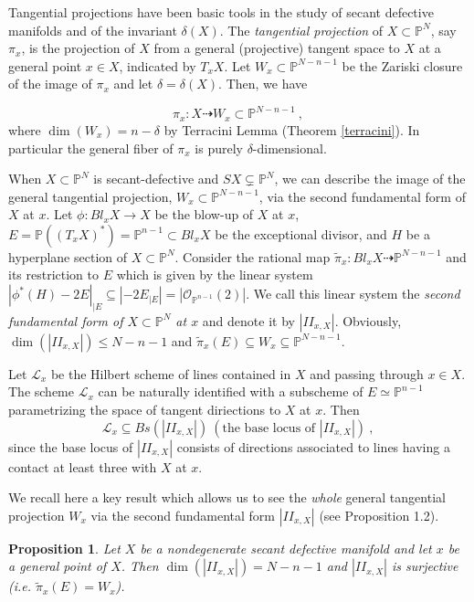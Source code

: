 \documentclass[11pt]{amsart}
\def\P{{\mathbb P}}
\theoremstyle{theorem} %
\newtheorem{Prop}[Thm]{Proposition}
\theoremstyle{definition}
\numberwithin{equation}{section}
\begin{document}
Tangential projections have been basic tools in the study of secant defective manifolds and of the invariant $\delta(X)$. The \textit{tangential projection} of $X\subset\P^N$, say $\pi_x$, is the projection of $X$ from a general (projective) tangent space to $X$ at a general point $x\in X$, indicated by $T_xX$. Let $W_x\subset\P^{N-n-1}$ be the Zariski closure of the image of $\pi_x$ and let $\delta=\delta(X)$. Then, we have

\begin{equation}\label{tg_pr}
  \pi_x : X\dashrightarrow W_x \subset \P^{N-n-1}~,
\end{equation}
where $\dim(W_x)=n-\delta$ by Terracini Lemma (Theorem \ref{terracini}). In particular the general fiber of $\pi_x$ is  purely $\delta$-dimensional. 

When $X\subset\P^N$ is secant-defective and $SX\subsetneq\P^N$, we can describe the image of the general tangential projection, $W_x\subset \P^{N-n-1}$, via the second fundamental form of $X$ at $x$. Let $\phi: Bl_xX\to X$ be the blow-up of $X$ at $x$, $E=\P((T_xX)^{\ast})=\P^{n-1}\subset Bl_xX$ be the exceptional divisor, and $H$ be a hyperplane section of $X\subset\P^N$. Consider the rational map $\tilde{\pi}_x : Bl_xX\dashrightarrow \P^{N-n-1}$ and its restriction to $E$ which is given by the linear system $|\phi^{\ast}(H)-2E|_{|E}\subseteq |-2E_{|E}|=|\mathcal O_{\P^{n-1}}(2)|$. We call this linear system the \textit{second fundamental form of $X\subset\P^N$ at $x$} and denote it by $|II_{x,X}|$. Obviously, $\dim(|II_{x,X}|)\le N-n-1$ and $\tilde{\pi}_x(E)\subseteq W_x\subseteq \P^{N-n-1}$. 

Let $\mathcal{L}_x$ be the Hilbert scheme of lines contained in $X$ and passing through $x\in X$. The scheme $\mathcal L_x$ can be naturally identified with a subscheme of $E\simeq\P^{n-1}$ parametrizing the space of tangent diriections to $X$ at $x$. Then
\begin{equation}\label{tg_pr}
  \mathcal{L}_x \subseteq Bs(|II_{x,X}|)~(\textrm{the base locus of $|II_{x,X}|$})~,
\end{equation}
since the base locus of $|II_{x,X}|$ consists of directions associated to lines having a contact at least three with $X$ at $x$. 

We recall here a key result which allows us to see the \textit{whole} general tangential projection $W_x$ via the second fundamental form $|II_{x,X}|$ (see \cite{IR2} Proposition 1.2).

\begin{Prop}\label{IR}
Let $X$ be a nondegenerate secant defective manifold and let $x$ be a general point of $X$. Then $\dim(|II_{x,X}|)=N-n-1$ and $|II_{x,X}|$ is surjective (i.e. $\tilde{\pi}_x(E)=W_x$).
\end{Prop}
\end{document}
